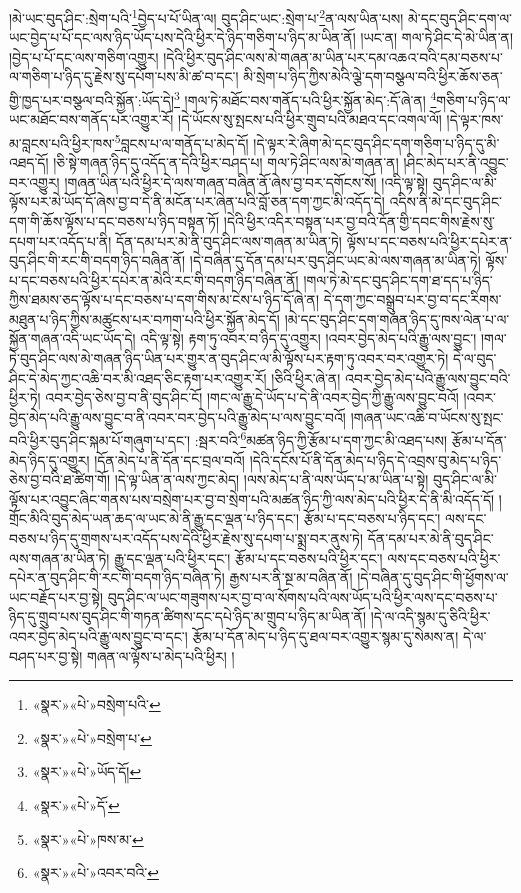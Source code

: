 །མེ་ཡང་བུད་ཤིང་:སྲེག་པའི་\footnote{«སྣར་»«པེ་»བསྲེག་པའི་}བྱེད་པ་པོ་ཡིན་ལ། བུད་ཤིང་ཡང་:སྲེག་པ་\footnote{«སྣར་»«པེ་»བསྲེག་པ་}ན་ལས་ཡིན་པས། མེ་དང་བུད་ཤིང་དག་ལ་ཡང་བྱེད་པ་པོ་དང་ལས་ཉིད་ཡོད་པས་དེའི་ཕྱིར་དེ་ཉིད་གཅིག་པ་ཉིད་མ་ཡིན་ནོ། །ཡང་ན། གལ་ཏེ་ཤིང་དེ་མེ་ཡིན་ན། །བྱེད་པ་པོ་དང་ལས་གཅིག་འགྱུར། །དེའི་ཕྱིར་བུད་ཤིང་ལས་མེ་གཞན་མ་ཡིན་པར་དམ་འཆའ་བའི་དམ་བཅས་པ་ལ་གཅིག་པ་ཉིད་དུ་རྗེས་སུ་དཔོག་པས་མི་ཚ་བ་དང་། མི་སྲེག་པ་ཉིད་ཀྱིས་མེའི་ལྕེ་དག་བསྩལ་བའི་ཕྱིར་ཆོས་ཅན་གྱི་ཁྱད་པར་བསྩལ་བའི་སྐྱོན་:ཡོད་དེ།\footnote{«སྣར་»«པེ་»ཡོད་དོ།} །གལ་ཏེ་མཐོང་བས་གནོད་པའི་ཕྱིར་སྐྱོན་མེད་:དོ་ཞེ་ན། \footnote{«སྣར་»«པེ་»དོ་}གཅིག་པ་ཉིད་ལ་ཡང་མཐོང་བས་གནོད་པར་འགྱུར་རོ། །དེ་ཡོངས་སུ་སྤངས་པའི་ཕྱིར་གྲུབ་པའི་མཐའ་དང་འགལ་ལོ། །དེ་ལྟར་ཁས་མ་བླངས་པའི་ཕྱིར་ཁས་\footnote{«སྣར་»«པེ་»ཁས་མ་}བླངས་པ་ལ་གནོད་པ་མེད་དོ། །དེ་ལྟར་རེ་ཞིག་མེ་དང་བུད་ཤིང་དག་གཅིག་པ་ཉིད་དུ་མི་འཐད་དོ། །ཅི་སྟེ་གཞན་ཉིད་དུ་འདོད་ན་དེའི་ཕྱིར་བཤད་པ། གལ་ཏེ་ཤིང་ལས་མེ་གཞན་ན། །ཤིང་མེད་པར་ནི་འབྱུང་བར་འགྱུར། །གཞན་ཡིན་པའི་ཕྱིར་དེ་ལས་གཞན་བཞིན་ནོ་ཞེས་བྱ་བར་དགོངས་སོ། །འདི་ལྟ་སྟེ། བུད་ཤིང་ལ་མི་ལྟོས་པར་མེ་ཡོད་དོ་ཞེས་བྱ་བ་དེ་ནི་མངོན་པར་ཞེན་པའི་བློ་ཅན་དག་ཀྱང་མི་འདོད་དེ། འདིས་ནི་མེ་དང་བུད་ཤིང་དག་གི་ཆོས་ལྟོས་པ་དང་བཅས་པ་ཉིད་བསྟན་ཏོ། །དེའི་ཕྱིར་འདིར་བསྟན་པར་བྱ་བའི་དོན་གྱི་དབང་གིས་རྗེས་སུ་དཔག་པར་འདོད་པ་ནི། དོན་དམ་པར་མེ་ནི་བུད་ཤིང་ལས་གཞན་མ་ཡིན་ཏེ། ལྟོས་པ་དང་བཅས་པའི་ཕྱིར་དཔེར་ན་བུད་ཤིང་གི་རང་གི་བདག་ཉིད་བཞིན་ནོ། །དེ་བཞིན་དུ་དོན་དམ་པར་བུད་ཤིང་ཡང་མེ་ལས་གཞན་མ་ཡིན་ཏེ། ལྟོས་པ་དང་བཅས་པའི་ཕྱིར་དཔེར་ན་མེའི་རང་གི་བདག་ཉིད་བཞིན་ནོ། །གལ་ཏེ་མེ་དང་བུད་ཤིང་དག་ཐ་དད་པ་ཉིད་ཀྱིས་ཐམས་ཅད་ལྟོས་པ་དང་བཅས་པ་དག་གིས་མ་ངེས་པ་ཉིད་དོ་ཞེ་ན། དེ་དག་ཀྱང་བསྒྲུབ་པར་བྱ་བ་དང་རིགས་མཐུན་པ་ཉིད་ཀྱིས་མཚུངས་པར་བཀག་པའི་ཕྱིར་སྐྱོན་མེད་དོ། །མེ་དང་བུད་ཤིང་དག་གཞན་ཉིད་དུ་ཁས་ལེན་པ་ལ་སྐྱོན་གཞན་འདི་ཡང་ཡོད་དེ། འདི་ལྟ་སྟེ། རྟག་ཏུ་འབར་བ་ཉིད་དུ་འགྱུར། །འབར་བྱེད་མེད་པའི་རྒྱུ་ལས་བྱུང་། །གལ་ཏེ་བུད་ཤིང་ལས་མེ་གཞན་ཉིད་ཡིན་པར་གྱུར་ན་བུད་ཤིང་ལ་མི་ལྟོས་པར་རྟག་ཏུ་འབར་བར་འགྱུར་ཏེ། དེ་ལ་བུད་ཤིང་དེ་མེད་ཀྱང་འཆི་བར་མི་འཐད་ཅིང་རྟག་པར་འགྱུར་རོ། །ཅིའི་ཕྱིར་ཞེ་ན། འབར་བྱེད་མེད་པའི་རྒྱུ་ལས་བྱུང་བའི་ཕྱིར་ཏེ། འབར་བྱེད་ཅེས་བྱ་བ་ནི་བུད་ཤིང་ངོ། །གང་ལ་རྒྱུ་དེ་ཡོད་པ་དེ་ནི་འབར་བྱེད་ཀྱི་རྒྱུ་ལས་བྱུང་བའོ། །འབར་བྱེད་མེད་པའི་རྒྱུ་ལས་བྱུང་བ་ནི་འབར་བར་བྱེད་པའི་རྒྱུ་མེད་པ་ལས་བྱུང་བའོ། །གཞན་ཡང་འཆི་བ་ཡོངས་སུ་སྤང་བའི་ཕྱིར་བུད་ཤིང་སྐམ་པོ་གཞུག་པ་དང་། :སྦར་བའི་\footnote{«སྣར་»«པེ་»འབར་བའི་}མཚན་ཉིད་ཀྱི་རྩོམ་པ་དག་ཀྱང་མི་འཐད་པས། རྩོམ་པ་དོན་མེད་ཉིད་དུ་འགྱུར། །དོན་མེད་པ་ནི་དོན་དང་བྲལ་བའོ། །དེའི་དངོས་པོ་ནི་དོན་མེད་པ་ཉིད་དེ་འབྲས་བུ་མེད་པ་ཉིད་ཅེས་བྱ་བའི་ཐ་ཚིག་གོ། །དེ་ལྟ་ཡིན་ན་ལས་ཀྱང་མེད། །ལས་མེད་པ་ནི་ལས་ཡོད་པ་མ་ཡིན་པ་སྟེ། བུད་ཤིང་ལ་མི་ལྟོས་པར་འབྱུང་ཞིང་གནས་པས་བསྲེག་པར་བྱ་བ་སྲེག་པའི་མཚན་ཉིད་ཀྱི་ལས་མེད་པའི་ཕྱིར་དེ་ནི་མི་འདོད་དོ། །གྲོང་མིའི་བུད་མེད་ཡན་ཆད་ལ་ཡང་མེ་ནི་རྒྱུ་དང་ལྡན་པ་ཉིད་དང་། རྩོམ་པ་དང་བཅས་པ་ཉིད་དང་། ལས་དང་བཅས་པ་ཉིད་དུ་གྲགས་པར་འདོད་པས་དེའི་ཕྱིར་རྗེས་སུ་དཔག་པ་སྨྲ་བར་ནུས་ཏེ། དོན་དམ་པར་མེ་ནི་བུད་ཤིང་ལས་གཞན་མ་ཡིན་ཏེ། རྒྱུ་དང་ལྡན་པའི་ཕྱིར་དང་། རྩོམ་པ་དང་བཅས་པའི་ཕྱིར་དང་། ལས་དང་བཅས་པའི་ཕྱིར་དཔེར་ན་བུད་ཤིང་གི་རང་གི་བདག་ཉིད་བཞིན་ཏེ། རྒྱས་པར་ནི་སྔ་མ་བཞིན་ནོ། །དེ་བཞིན་དུ་བུད་ཤིང་གི་ཕྱོགས་ལ་ཡང་བརྗོད་པར་བྱ་སྟེ། བུད་ཤིང་ལ་ཡང་གཟུགས་པར་བྱ་བ་ལ་སོགས་པའི་ལས་ཡོད་པའི་ཕྱིར་ལས་དང་བཅས་པ་ཉིད་དུ་གྲུབ་པས་བུད་ཤིང་གི་གཏན་ཚིགས་དང་དཔེ་ཉིད་མ་གྲུབ་པ་ཉིད་མ་ཡིན་ནོ། །དེ་ལ་འདི་སྙམ་དུ་ཅིའི་ཕྱིར་འབར་བྱེད་མེད་པའི་རྒྱུ་ལས་བྱུང་བ་དང་། རྩོམ་པ་དོན་མེད་པ་ཉིད་དུ་ཐལ་བར་འགྱུར་སྙམ་དུ་སེམས་ན། དེ་ལ་བཤད་པར་བྱ་སྟེ། གཞན་ལ་ལྟོས་པ་མེད་པའི་ཕྱིར། །
